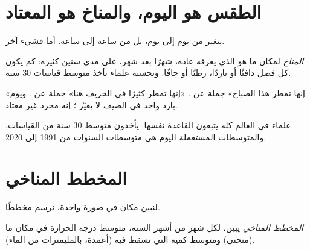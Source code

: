 \section{الطقس هو اليوم، والمناخ هو المعتاد}

يتغير  من يوم إلى يوم، بل من ساعة إلى ساعة. أما  فشيء
آخر.

\begin{definition}[المناخ]\label{def:g5:weather-and-climate:climate}
\emph{المناخ} لمكان ما هو  الذي يعرفه عادة، شهرًا بعد شهر،
على مدى سنين كثيرة: كم يكون كل فصل دافئًا أو باردًا، رطبًا أو جافًا. ويحسبه
علماء  بأخذ متوسط قياسات
30 سنة.
\end{definition}

«إنها تمطر هذا الصباح» جملة عن . «إنها تمطر كثيرًا في الخريف هنا» جملة
عن . ويوم بارد واحد في الصيف لا يغيّر ؛ إنه مجرد  غير
معتاد.

علماء  في العالم كله يتبعون القاعدة نفسها: يأخذون متوسط
30 سنة من القياسات. والمتوسطات المستعملة اليوم هي متوسطات السنوات
من 1991 إلى 2020.

\section{المخطط المناخي}

لنبين  مكان في صورة واحدة، نرسم مخططًا.

\begin{definition}\label{def:g5:weather-and-climate:climate-chart}
\emph{المخطط المناخي} يبين، لكل شهر من أشهر السنة، متوسط
درجة الحرارة في مكان ما (منحنى) ومتوسط كمية   التي تسقط فيه
(أعمدة، بالمليمترات من الماء).
\end{definition}

